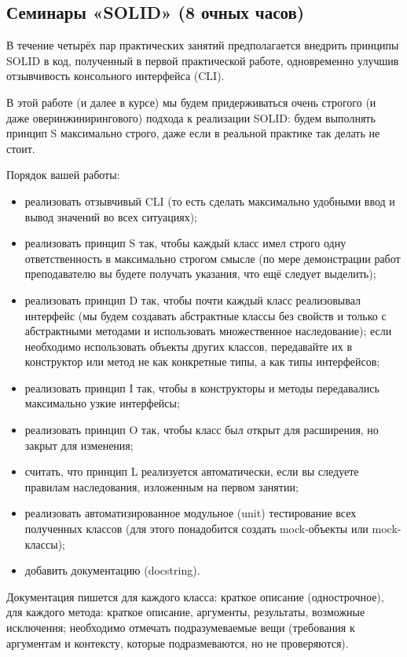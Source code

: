 \subsection{Семинары «SOLID» (8 очных часов)}

В течение четырёх пар практических занятий предполагается внедрить принципы SOLID
в код, полученный в первой практической работе, одновременно улучшив отзывчивость
консольного интерфейса (CLI).

В этой работе (и далее в курсе) мы будем придерживаться очень строгого
(и даже оверинжинирингового) подхода к реализации SOLID: будем выполнять
принцип S максимально строго, даже если в реальной практике так делать не стоит.

Порядок вашей работы:

\begin{itemize}
    \item реализовать отзывчивый CLI (то есть сделать максимально удобными ввод и вывод
    значений во всех ситуациях);
    \item реализовать принцип S так, чтобы каждый класс имел строго одну ответственность
    в максимально строгом смысле (по мере демонстрации работ преподавателю вы будете
    получать указания, что ещё следует выделить);
    \item реализовать принцип D так, чтобы почти каждый класс реализовывал интерфейс
    (мы будем создавать абстрактные классы без свойств и только с абстрактными методами
    и использовать множественное наследование); если необходимо использовать объекты
    других классов, передавайте их в конструктор или метод не как конкретные типы,
    а как типы интерфейсов;
    \item реализовать принцип I так, чтобы в конструкторы и методы передавались
    максимально узкие интерфейсы;
    \item реализовать принцип O так, чтобы класс был открыт для расширения,
    но закрыт для изменения;
    \item считать, что принцип L реализуется автоматически, если вы следуете
    правилам наследования, изложенным на первом занятии;
    \item реализовать автоматизированное модульное (unit) тестирование всех
    полученных классов (для этого понадобится создать mock-объекты или mock-классы);
    \item добавить документацию (docstring).
\end{itemize}

Документация пишется для каждого класса: краткое описание (однострочное), для каждого
метода: краткое описание, аргументы, результаты, возможные исключения; 
необходимо отмечать подразумеваемые вещи (требования к аргументам и контексту, которые
подразмеваются, но не проверяются).

